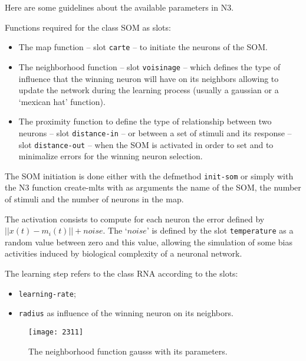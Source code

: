 \bigskip

Here are some guidelines about the available parameters in N3.

\bigskip
Functions required for the class SOM as slots:

\begin{itemize}
\item The map function -- slot \texttt{carte} -- to initiate the neurons of the SOM.
\item The neighborhood function -- slot \texttt{voisinage} -- which defines the type of influence that the winning neuron will have on its neighbors allowing to update the network during the learning process (usually a gaussian or a `mexican hat' function).
\item The proximity function to define the type of relationship %
between two neurons -- slot \texttt{distance-in} --  
or between a set of stimuli and its response -- slot \texttt{distance-out} -- when the SOM is activated in order to set and to minimalize errors for the winning neuron selection.
\end{itemize}

\bigskip

The SOM initiation is done either with the defmethod \texttt{init-som} or simply with the N3 function \glspl{create-mlt} with as arguments the name of the SOM, the number of stimuli and the number of neurons in the map.

\bigskip

The activation consists to compute for each neuron the error defined by $|| x(t) - m_i(t) || + noise$. The `$noise$' is defined by the slot \texttt{temperature} as a random value between zero and this value, allowing the simulation of some bias activities induced by biological complexity of a neuronal network.

\bigskip

The learning step refers to the class RNA according to the slots:

\begin{itemize}
\item \texttt{learning-rate};
\item \texttt{radius} as influence of the winning neuron on its neighbors. 
\end{itemize}

\begin{figure}[htbp]
\begin{center}
\texttt{[image: 2311]}
\caption{The neighborhood function \glspl{gauss} with its parameters. %
}
\label{fig:gs}
\end{center}
\end{figure}

